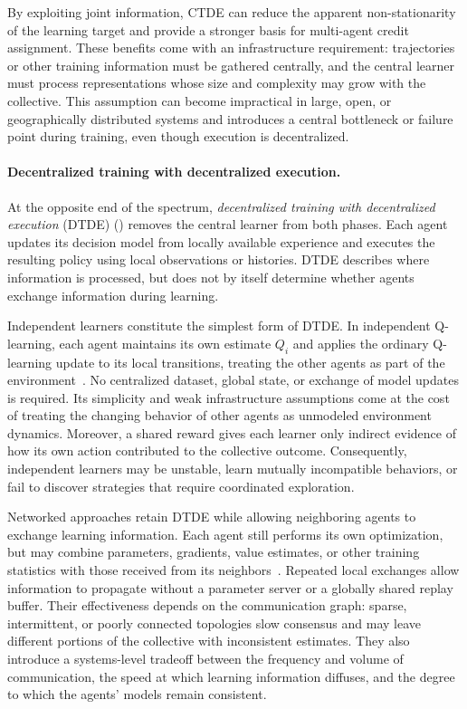 By exploiting joint information, CTDE can reduce the apparent non-stationarity
of the learning target and provide a stronger basis for multi-agent credit
assignment.
%
These benefits come with an infrastructure requirement: trajectories or other
training information must be gathered centrally, and the central learner must
process representations whose size and complexity may grow with the collective.
%
This assumption can become impractical in large, open, or geographically
distributed systems and introduces a central bottleneck or failure point during
training, even though execution is decentralized.

\paragraph{Decentralized training with decentralized execution.}
At the opposite end of the spectrum, \emph{decentralized training with
decentralized execution} (DTDE) () removes the central learner from both phases.
%
Each agent updates its decision model from locally available experience and
executes the resulting policy using local observations or histories.
%
DTDE describes where information is processed, but does not by itself determine
whether agents exchange information during learning.

Independent learners constitute the simplest form of DTDE.
%
In independent Q-learning, each agent maintains its own estimate $Q_i$ and
applies the ordinary Q-learning update to its local transitions, treating the
other agents as part of the environment~\cite{tan1993multiagent}.
%
No centralized dataset, global state, or exchange of model updates is required.
%
Its simplicity and weak infrastructure assumptions come at the cost of treating
the changing behavior of other agents as unmodeled environment dynamics.
%
Moreover, a shared reward gives each learner only indirect evidence of how its
own action contributed to the collective outcome.
%
Consequently, independent learners may be unstable, learn mutually incompatible
behaviors, or fail to discover strategies that require coordinated exploration.

Networked approaches retain DTDE while allowing neighboring agents to exchange
learning information.
%
Each agent still performs its own optimization, but may combine parameters,
gradients, value estimates, or other training statistics with those received
from its neighbors~\cite{DBLP:conf/icml/ZhangYBH18}.
%
Repeated local exchanges allow information to propagate without a parameter
server or a globally shared replay buffer.
%
Their effectiveness depends on the communication graph: sparse,
intermittent, or poorly connected topologies slow consensus and may leave
different portions of the collective with inconsistent estimates.
%
They also introduce a systems-level tradeoff between the frequency and volume of
communication, the speed at which learning information diffuses, and the degree
to which the agents' models remain consistent.

